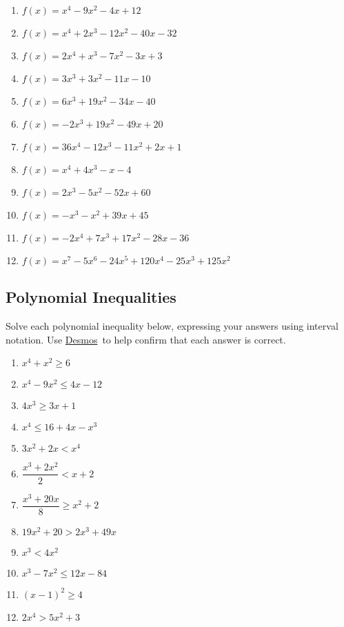 \documentclass[12pt]{book}
\theoremstyle{definition}
\newcommand{\Desmos}{\href{https://www.desmos.com/}{Desmos}}
\begin{document}
\begin{enumerate}[resume]
	\item $f(x) = x^{4} - 9x^{2} - 4x + 12$
	\item $f(x) = x^{4} + 2x^{3} - 12x^{2} - 40x - 32$
	\item $f(x) = 2x^4+x^3-7x^2-3x+3$
	\item $f(x) = 3x^{3} + 3x^{2} - 11x - 10$
	\item $f(x) = 6x^3+19x^2-34x-40$
	\item $f(x) = -2x^{3} + 19x^{2} - 49x + 20$
	\item $f(x) = 36x^{4} - 12x^{3} - 11x^{2} + 2x + 1$
	\item $f(x) = x^4+4x^3-x-4$	
	\item $f(x) = 2x^3-5x^2-52x+60$
	\item $f(x) = -x^3-x^2+39x+45$
	\item $f(x) = -2x^4+7x^3+17x^2-28x-36$
	\item $f(x) = x^7-5x^6-24x^5+120x^4-25x^3+125x^2$
\end{enumerate}
\subsection*{Polynomial Inequalities}
Solve each polynomial inequality below, expressing your answers using interval notation.  Use \Desmos \ to help confirm that each answer is correct.
\begin{multicols}{2}
\begin{enumerate}
 \item $x^4 + x^2 \geq 6$
 \item $x^{4} - 9x^{2} \leq 4x - 12$
 \item $4x^3 \geq 3x+1$
 \item $x^4 \leq 16+4x-x^3$
 \item $3x^2 + 2x < x^4$
 \item $\dfrac{x^3+2 x^2}{2} < x+2$
 \item $\dfrac{x^3+20x}{8} \geq x^2 + 2$
 \item $19x^{2} + 20 > 2x^{3} + 49x $
 \item $x^3<4x^2$
 \item $x^3-7x^2\leq 12x-84$
 \item $(x - 1)^{2} \geq 4$
 \item $2x^4>5x^2+3$
\end{enumerate}
\end{multicols}
\end{document}
